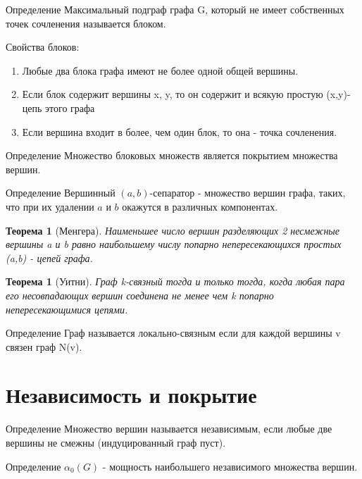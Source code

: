 \documentclass[a4paper,openany]{book}
\newcounter{TheoremCounter}
\newtheorem{theorem}[TheoremCounter]{Теорема}
\newenvironment{definition}
{\begin{statement}{Определение}}
    {\end{statement}}
\begin{document}
\begin{definition}
  Максимальный подграф графа G, который не имеет собственных точек сочленения называется блоком.
\end{definition}

Свойства блоков:
\begin{enumerate}
  \item Любые два блока графа имеют не более одной общей вершины.
  \item Если блок содержит вершины x, y, то он содержит и всякую простую (x,y)-цепь этого графа
  \item Если вершина входит в более, чем один блок, то она - точка сочленения.
\end{enumerate}

\begin{definition}
  Множество блоковых множеств является покрытием множества вершин.
\end{definition}
\begin{definition}
  Вершинный $(a,b)$-сепаратор - множество вершин графа, таких, что при их
  удалении $a$ и $b$ окажутся в различных компонентах.
\end{definition}

\begin{theorem}[Менгера]
  Наименьшее число вершин разделяющих 2 несмежные вершины a и b равно наибольшему числу попарно непересекающихся простых (a,b) - цепей графа.
\end{theorem}

\begin{theorem}[Уитни]
  Граф k-связный тогда и только тогда, когда любая пара его несовпадающих вершин соединена не менее чем k попарно непересекающимися цепями.
\end{theorem}
\begin{definition}
  Граф называется локально-связным если для каждой вершины v связен граф N(v).
\end{definition}


\chapter{Независимость и покрытие}
\begin{definition}
  Множество вершин называется независимым, если любые две вершины не смежны (индуцированный граф пуст).
\end{definition}
\begin{definition}
  $\alpha_0(G)$ - мощность наибольшего независимого множества вершин.
\end{definition}
\end{document}

